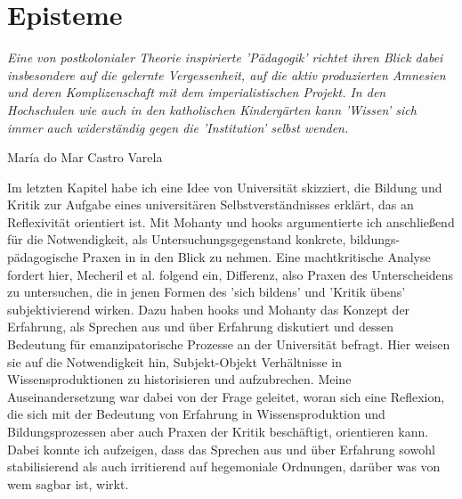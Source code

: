 \section{Episteme} \epigraph{\textit{ Eine von postkolonialer Theorie
inspirierte 'Pädagogik' richtet ihren Blick dabei insbesondere auf die
gelernte Vergessenheit, auf die aktiv produzierten Amnesien und deren
Komplizenschaft mit dem imperialistischen Projekt. In den Hochschulen wie auch
in den katholischen Kindergärten kann 'Wissen' sich immer auch
widerständig gegen die 'Institution' selbst wenden. }}{María do Mar
Castro Varela\footnotemark}  

Im letzten Kapitel habe ich eine Idee von Universität skizziert,
die Bildung und Kritik zur Aufgabe eines universitären Selbstverständnisses
erklärt, das an Reflexivität orientiert ist. Mit Mohanty und hooks argumentierte
ich anschließend für die Notwendigkeit, als Untersuchungsgegenstand konkrete,
bildungs-pädagogische Praxen in in den Blick zu nehmen. Eine machtkritische
Analyse fordert hier, Mecheril et al. folgend ein, Differenz, also Praxen des
Unterscheidens zu untersuchen, die in jenen Formen des 'sich bildens' und
'Kritik übens' subjektivierend wirken. Dazu haben hooks und Mohanty das Konzept
der Erfahrung, als Sprechen aus und über Erfahrung diskutiert und dessen
Bedeutung für emanzipatorische Prozesse an der Universität befragt. Hier weisen
sie auf die Notwendigkeit hin, Subjekt-Objekt Verhältnisse in
Wissensproduktionen zu historisieren und aufzubrechen.
Meine Auseinandersetzung
war dabei von der Frage geleitet, woran sich eine Reflexion, die sich mit der
Bedeutung von Erfahrung in Wissensproduktion und Bildungsprozessen aber auch
Praxen der Kritik beschäftigt, orientieren kann. Dabei konnte ich aufzeigen,
dass das Sprechen aus und über Erfahrung sowohl stabilisierend als auch
irritierend auf hegemoniale Ordnungen, darüber was von wem sagbar ist, wirkt.


